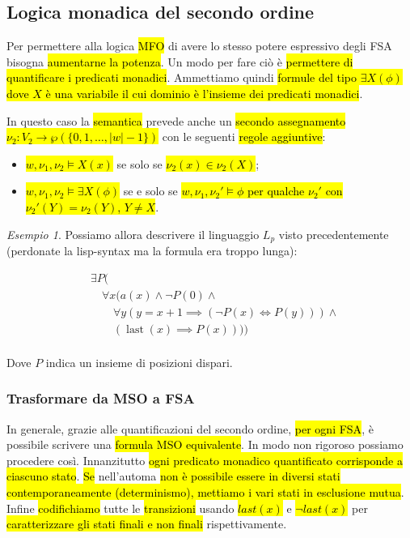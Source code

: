 \documentclass[a4paper,11pt,oneside]{article}
\theoremstyle{plain}
\theoremstyle{definition}
\theoremstyle{remark}
\newtheorem{esempio}{Esempio}[section]
\DeclareMathOperator{\last}{last}
\begin{document}
\subsection{Logica monadica del secondo ordine}\label{sec:mso}

Per permettere alla logica \hl{MFO} di avere lo stesso potere espressivo degli
FSA bisogna \hl{aumentarne la potenza}. Un modo per fare ciò è \hl{permettere di
quantificare i predicati monadici}. Ammettiamo quindi \hl{formule del tipo
$\exists X(\phi)$ dove $X$ è una variabile il cui dominio è l'insieme dei
predicati monadici}.

In questo caso la \hl{semantica} prevede anche un \hl{secondo assegnamento}
\hl{$\nu_2: V_2 \to \wp(\{0,1,\ldots,|w|-1\})$} con le seguenti \hl{regole
aggiuntive}:

\begin{itemize}
  \item \hl{$w, \nu_1, \nu_2 \models X(x)$} se solo se
    \hl{$\nu_2(x) \in \nu_2(X)$};
  \item \hl{$w, \nu_1, \nu_2 \models \exists X(\phi)$} se e solo se
    \hl{$w, \nu_1, \nu_2' \models \phi$ per qualche $\nu_2'$ con
    $\nu_2'(Y) = \nu_2(Y)$, $Y \neq X$}.
\end{itemize}

\begin{esempio}
  Possiamo allora descrivere il linguaggio $L_p$ visto precedentemente
  (perdonate la lisp-syntax ma la formula era troppo lunga):

  \begin{align*}
    & \exists P( \\
    &   \quad \forall x(a(x) \land \neg P(0) \land \\
    &   \quad \quad \forall y (y = x+1 \implies (\neg P(x) \iff P(y))) \land \\
    &   \quad \quad (\last(x) \implies P(x)))) \\
  \end{align*}

  Dove $P$ indica un insieme di posizioni dispari.
\end{esempio}

\subsubsection{Trasformare da MSO a FSA}\label{sec:mso-fsa}

In generale, grazie alle quantificazioni del secondo ordine, \hl{per ogni FSA},
è possibile scrivere una \hl{formula MSO equivalente}. In modo non rigoroso
possiamo procedere così. Innanzitutto \hl{ogni predicato monadico quantificato
corrisponde a ciascuno stato}. \hl{Se} nell'automa \hl{non è possibile essere in
diversi stati contemporaneamente (determinismo), mettiamo i vari stati in
esclusione mutua}. Infine \hl{codifichiamo} tutte le \hl{transizioni} usando
\hl{$last(x)$} e \hl{$\neg last(x)$} per \hl{caratterizzare gli stati finali e
non finali} rispettivamente.
\end{document}
